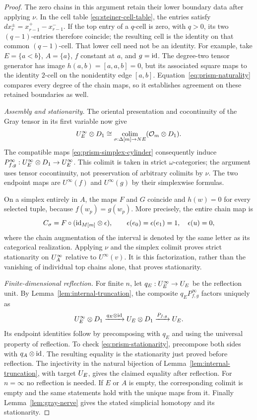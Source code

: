 \begin{proof}
The zero chains in this argument retain their lower boundary data after
applying $\nu$.  In the cell table \eqref{eq:steiner-cell-table},
the entries satisfy
$d x_r^\pm=x_{r-1}^+-x_{r-1}^-$.
If the top entry of a $q$-cell is zero, with $q>0$, its two
$(q-1)$-entries therefore coincide; the resulting cell is the identity
on that common $(q-1)$-cell.  That lower cell need not be an identity.
For example, take $E=\{a<b\}$, $A=\{a\}$, $f$ constant at $a$,
and $g=\mathrm{id}$.  The degree-two tensor generator has image
$h(a,b)=[a,a,b]=0$, but its associated square maps to the identity
$2$-cell on the nonidentity edge $[a,b]$.
Equation~\eqref{eq:prism-naturality} compares every degree of the chain
maps, so it establishes agreement on these retained boundaries as well.

\smallskip\noindent\emph{Assembly and stationarity.}
The oriental presentation and cocontinuity of the Gray tensor in its
first variable now give
\[
 U^{\infty}_{E}\otimes D_{1}
 \cong
 \operatorname*{colim}_{\sigma:\Delta[m]\to N E}
       (\mathcal O_{m}\otimes D_{1}).
\]
The compatible maps \eqref{eq:prism-simplex-cylinder} consequently
induce $P^\infty_{f,g}:U^{\infty}_{E}\otimes D_{1}\to U^{\infty}_{E}$.
This colimit is taken in strict $\omega$-categories; the argument uses
tensor cocontinuity, not preservation of arbitrary colimits by $\nu$.
The two endpoint maps are $U^\infty(f)$ and $U^\infty(g)$ by their
simplexwise formulas.

On a simplex entirely in $A$, the maps $F$ and $G$ coincide and
$h(w)=0$ for every selected tuple, because
$f(w_p)=g(w_p)$.  More precisely, the entire chain map is
\[
 C_\sigma=F\circ(\mathrm{id}_{M[m]}\otimes\epsilon),
 \qquad \epsilon(e_0)=\epsilon(e_1)=1,\quad\epsilon(u)=0,
\]
where the chain augmentation of the interval is denoted by the same
letter as its categorical realization.  Applying $\nu$ and the
simplex colimit proves strict stationarity on $U^{\infty}_{A}$ relative to
$U^\infty(v)$.  It is this factorization, rather than the vanishing of
individual top chains alone, that proves stationarity.

\smallskip\noindent\emph{Finite-dimensional reflection.}
For finite $n$, let $q_E:U^{\infty}_{E}\to U_{E}$ be the reflection unit.
By Lemma~\ref{lem:internal-truncation}, the composite
$q_E P^\infty_{f,g}$ factors uniquely as
\[
 U^{\infty}_{E}\otimes D_{1}
  \xrightarrow{q_E\otimes\mathrm{id}}U_{E}\otimes D_{1}
  \xrightarrow{P_{f,g}}U_{E}.
\]
Its endpoint identities follow by precomposing with $q_E$ and using
the universal property of reflection.  To check
\eqref{eq:prism-stationarity}, precompose both sides with
$q_A\otimes\mathrm{id}$.  The resulting equality is the stationarity just
proved before reflection.  The injectivity in the natural bijection
of Lemma~\ref{lem:internal-truncation}, with target $U_{E}$, gives
the claimed equality after reflection.
For $n=\infty$ no reflection is needed.
If $E$ or $A$ is empty, the corresponding colimit is empty and the
same statements hold with the unique maps from it.
Finally Lemma~\ref{lem:gray-nerve} gives the stated simplicial homotopy
and its stationarity.
\end{proof}

